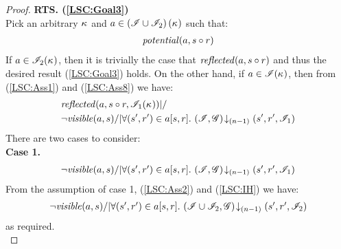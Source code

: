 \begin{lemma}
\begin{proof}
\noindent\textbf{RTS. (\ref{LSC:Goal3})}\\
Pick an arbitrary $\kappa_{}$ and $a \in \left(\mathscr{I} \cup \mathscr{I}_2 \right)(\kappa_{})$ such that:
%
\begin{align}
	\mathit{potential}(a, s \circ r)\label{LSC:Ass8}
\end{align}
%
If $a \in \mathscr{I}_2 (\kappa_{})$, then it is trivially the case that $\mathit{reflected}(a, s \circ r)$ and thus the desired result (\ref{LSC:Goal3}) holds. On the other hand, if $a \in \mathscr{I}(\kappa_{})$, then from (\ref{LSC:Ass1}) and (\ref{LSC:Ass8}) we have:
%
\begin{align*}
	& \mathit{reflected}(a, s \circ r, \mathscr{I}_1(\kappa_{})) |/ \\
	& \neg \mathit{visible}(a, s) /| \forall (s', r') \in a[s, r].\, \left(\mathscr{I}, \mathscr{G}\right) \!\downarrow_{(n-1)} \left(s', r', \mathscr{I}_1\right) 
\end{align*}
%
There are two cases to consider:\\
\noindent\textbf{Case 1.} 
%
\[
\begin{array}{l}
	\neg \mathit{visible}(a, s) /| \forall (s', r') \in a[s, r].\,  \left(\mathscr{I}, \mathscr{G}\right) \!\downarrow_{(n-1)} \left(s', r', \mathscr{I}_1\right)
\end{array}
\]
From the assumption of case 1, (\ref{LSC:Ass2}) and (\ref{LSC:IH}) we have: 
%
\[
\begin{array}{l}
	\neg \mathit{visible}(a, s) /| \forall (s', r') \in a[s, r].\, \left(\mathscr{I} \cup \mathscr{I}_2, \mathscr{G}\right) \!\downarrow_{(n-1)} \left(s', r', \mathscr{I}_2\right)
\end{array}
\]
as required.\\


\end{proof}
\end{lemma}
